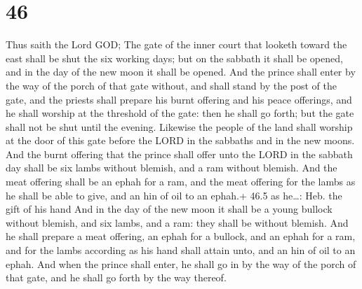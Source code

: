 \hypertarget{section-45}{%
\section{46}\label{section-45}}

 Thus saith the Lord GOD; The gate of the inner court that
looketh toward the east shall be shut the six working days; but on the
sabbath it shall be opened, and in the day of the new moon it shall be
opened.  And the prince shall enter by the way of the porch
of that gate without, and shall stand by the post of the gate, and the
priests shall prepare his burnt offering and his peace offerings, and he
shall worship at the threshold of the gate: then he shall go forth; but
the gate shall not be shut until the evening.  Likewise the
people of the land shall worship at the door of this gate before the
LORD in the sabbaths and in the new moons.  And the burnt
offering that the prince shall offer unto the LORD in the sabbath day
shall be six lambs without blemish, and a ram without blemish.
 And the meat offering shall be an ephah for a ram, and the
meat offering for the lambs as he shall be able to give, and an hin of
oil to an ephah.+ 46.5 as he\ldots: Heb. the gift of his hand
 And in the day of the new moon it shall be a young bullock
without blemish, and six lambs, and a ram: they shall be without
blemish.  And he shall prepare a meat offering, an ephah for
a bullock, and an ephah for a ram, and for the lambs according as his
hand shall attain unto, and an hin of oil to an ephah.  And
when the prince shall enter, he shall go in by the way of the porch of
that gate, and he shall go forth by the way thereof.

